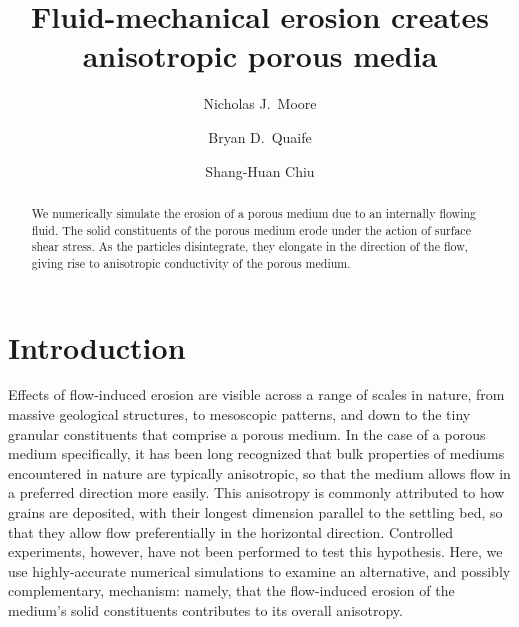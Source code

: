 \documentclass[preprint, superscriptaddress, notitlepage]{revtex4-1}
\begin{document}
\title{Fluid-mechanical erosion creates anisotropic porous media}


\author{Nicholas J.~Moore}
\author{Bryan D.~Quaife}
\author{Shang-Huan Chiu}

\begin{abstract}
We numerically simulate the erosion of a porous medium due to an internally flowing fluid.  The solid constituents of the porous medium erode under the action of surface shear stress. As the particles disintegrate, they elongate in the direction of the flow, giving rise to anisotropic conductivity of the porous medium.
\end{abstract}
\maketitle



\section{Introduction}

Effects of flow-induced erosion are visible across a range of scales in nature, from massive geological structures, to mesoscopic patterns, and down to the tiny granular constituents that comprise a porous medium. In the case of a porous medium specifically, it has been long recognized that bulk properties of mediums encountered in nature are typically anisotropic, so that the medium allows flow in a preferred direction more easily. This anisotropy is commonly attributed to how grains are deposited, with their longest dimension parallel to the settling bed, so that they allow flow preferentially in the horizontal direction. Controlled experiments, however, have not been performed to test this hypothesis. Here, we use highly-accurate numerical simulations to examine an alternative, and possibly complementary, mechanism: namely, that the flow-induced erosion of the medium's solid constituents contributes to its overall anisotropy.
\end{document}
